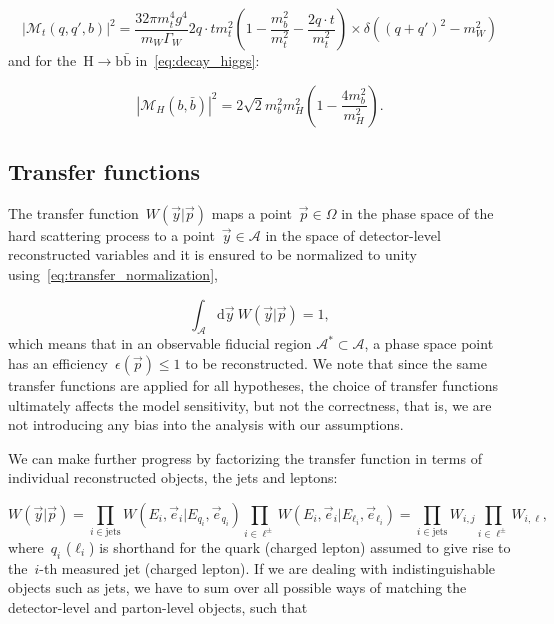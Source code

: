 \begin{equation}
\label{eq:decay_top}
|\mathcal{M}_t(q,q',b)|^2 = \frac{32\pi m_t^4 g^4}{m_W \Gamma_W} {2 q\cdot t}{m_t^2} (1 - \frac{m_b^2}{m_t^2} - \frac{2 q \cdot t}{m_t^2}) \times \delta((q+q')^2 - m_W^2)
\end{equation}
and for the~$\mathrm{H} \rightarrow \mathrm{b}\bar{\mathrm{b}}$ in~\cref{eq:decay_higgs}:

\begin{equation}
\label{eq:decay_higgs}
|\mathcal{M}_H(b,\bar{b})|^2 = 2\sqrt{2} m_b^2 m_H^2 (1 - \frac{4m_b^2}{m_H^2}).
\end{equation}

\subsection{Transfer functions}
\label{sec:transfer_functions}

The transfer function~$W(\vec{y} | \vec{p})$ maps a point~$\vec{p} \in \Omega$ in the phase space of the hard scattering process to a point~$\vec{y} \in \mathcal{A}$ in the space of detector-level reconstructed variables and it is ensured to be normalized to unity using~\cref{eq:transfer_normalization},

\begin{equation}
\label{eq:transfer_normalization}
\int_{\mathcal{A}} \mathrm{d}\vec{y}~W(\vec{y} | \vec{p}) = 1,
\end{equation}
which means that in an observable fiducial region $\mathcal{A}^* \subset \mathcal{A}$, a phase space point has an efficiency~$\epsilon(\vec{p}) \leq 1$ to be reconstructed. We note that since the same transfer functions are applied for all hypotheses, the choice of transfer functions ultimately affects the model sensitivity, but not the correctness, that is, we are not introducing any bias into the analysis with our assumptions.

We can make further progress by factorizing the transfer function in terms of individual reconstructed objects, the jets and leptons:

\begin{equation}
W(\vec{y} | \vec{p}) = \prod_{i\in \mathrm{jets}} W(E_i, \vec{e}_i | E_{q_i}, \vec{e}_{q_i})
\prod_{i\in \ell^\pm} W(E_i, \vec{e}_i | E_{\ell_i}, \vec{e}_{\ell_i}) = \prod_{i \in \mathrm{jets}} W_{i,j} \prod_{i \in \ell^\pm} W_{i,\ell},
\end{equation}
where~$q_i$ ($\ell_i$) is shorthand for the quark (charged lepton) assumed to give rise to the~$i$-th measured jet (charged lepton). If we are dealing with indistinguishable objects such as jets, we have to sum over all possible ways of matching the detector-level and parton-level objects, such that

